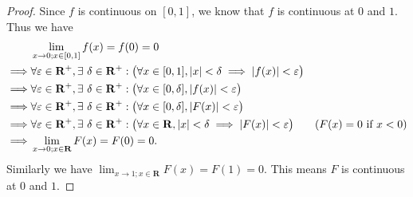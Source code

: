 \begin{proof}
    Since \(f\) is continuous on \([0, 1]\), we know that \(f\) is continuous at \(0\) and \(1\).
    Thus we have
    \begin{align*}
                 & \lim_{x \to 0 ; x \in [0, 1]} f(x) = f(0) = 0                                                                                                                                                    \\
        \implies & \forall \varepsilon \in \mathbf{R}^+, \exists\ \delta \in \mathbf{R}^+ : \big(\forall x \in [0, 1], \abs*{x} < \delta \implies \abs*{f(x)} < \varepsilon\big)                                    \\
        \implies & \forall \varepsilon \in \mathbf{R}^+, \exists\ \delta \in \mathbf{R}^+ : \big(\forall x \in [0, \delta], \abs*{f(x)} < \varepsilon\big)                                                          \\
        \implies & \forall \varepsilon \in \mathbf{R}^+, \exists\ \delta \in \mathbf{R}^+ : \big(\forall x \in [0, \delta], \abs*{F(x)} < \varepsilon\big)                                                          \\
        \implies & \forall \varepsilon \in \mathbf{R}^+, \exists\ \delta \in \mathbf{R}^+ : \big(\forall x \in \mathbf{R}, \abs*{x} < \delta \implies \abs*{F(x)} < \varepsilon\big) & (F(x) = 0 \text{ if } x < 0) \\
        \implies & \lim_{x \to 0 ; x \in \mathbf{R}} F(x) = F(0) = 0.
    \end{align*}
    Similarly we have \(\lim_{x \to 1 ; x \in \mathbf{R}} F(x) = F(1) = 0\).
    This means \(F\) is continuous at \(0\) and \(1\).


\end{proof}
